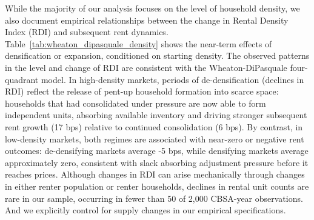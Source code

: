 \documentclass[pdflatex,sn-basic]{sn-jnl}%
\theoremstyle{thmstyleone}%
\theoremstyle{thmstyletwo}%
\theoremstyle{thmstylethree}%
\begin{document}
While the majority of our analysis focuses on the level of household density, we also document empirical relationships between the change in Rental Density Index (RDI) and subsequent rent dynamics. Table~\ref{tab:wheaton_dipasquale_density} shows the near-term effects of densification or expansion, conditioned on starting density. The observed patterns in the level and change of RDI are consistent with the Wheaton-DiPasquale four-quadrant model. In high-density markets, periods of de-densification (declines in RDI) reflect the release of pent-up household formation into scarce space: households that had consolidated under pressure are now able to form independent units, absorbing available inventory and driving stronger subsequent rent growth (17 bps) relative to continued consolidation (6 bps). By contrast, in low-density markets, both regimes are associated with near-zero or negative rent outcomes: de-densifying markets average -5 bps, while densifying markets average approximately zero, consistent with slack absorbing adjustment pressure before it reaches prices. Although changes in RDI can arise mechanically through changes in either renter population or renter households, declines in rental unit counts are rare in our sample, occurring in fewer than 50 of 2,000 CBSA-year observations. And we explicitly control for supply changes in our empirical specifications.
\end{document}

